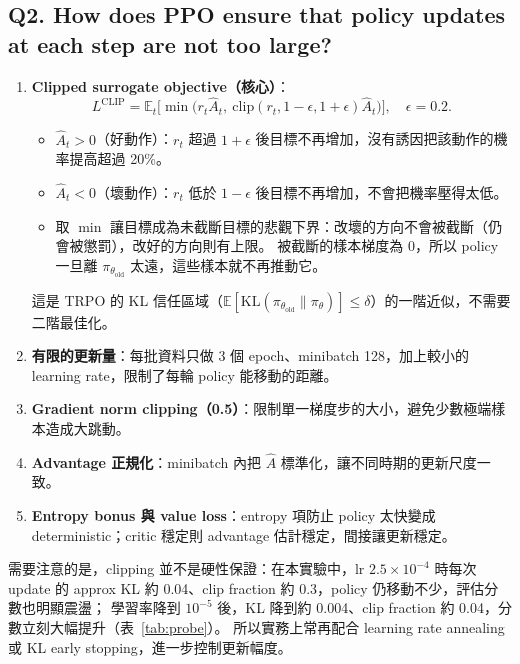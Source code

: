 \documentclass[11pt,a4paper]{article}
\begin{document}
\subsection*{Q2. How does PPO ensure that policy updates at each step are not too large?}
\begin{enumerate}[leftmargin=1.5em]
  \item \textbf{Clipped surrogate objective（核心）}：
  \[
  L^{\text{CLIP}}=\mathbb{E}_t\big[\min\big(r_t\hat A_t,\ \mathrm{clip}(r_t,1-\epsilon,1+\epsilon)\hat A_t\big)\big],\quad \epsilon=0.2 .
  \]
  \begin{itemize}[leftmargin=1.2em]
    \item $\hat A_t>0$（好動作）：$r_t$ 超過 $1+\epsilon$ 後目標不再增加，沒有誘因把該動作的機率提高超過 20\%。
    \item $\hat A_t<0$（壞動作）：$r_t$ 低於 $1-\epsilon$ 後目標不再增加，不會把機率壓得太低。
    \item 取 $\min$ 讓目標成為未截斷目標的悲觀下界：改壞的方向不會被截斷（仍會被懲罰），改好的方向則有上限。
          被截斷的樣本梯度為 0，所以 policy 一旦離 $\pi_{\theta_\text{old}}$ 太遠，這些樣本就不再推動它。
  \end{itemize}
  這是 TRPO 的 KL 信任區域（$\mathbb{E}[\mathrm{KL}(\pi_{\theta_\text{old}}\|\pi_\theta)]\le\delta$）的一階近似，不需要二階最佳化。
  \item \textbf{有限的更新量}：每批資料只做 3 個 epoch、minibatch 128，加上較小的 learning rate，限制了每輪 policy 能移動的距離。
  \item \textbf{Gradient norm clipping（0.5）}：限制單一梯度步的大小，避免少數極端樣本造成大跳動。
  \item \textbf{Advantage 正規化}：minibatch 內把 $\hat A$ 標準化，讓不同時期的更新尺度一致。
  \item \textbf{Entropy bonus 與 value loss}：entropy 項防止 policy 太快變成 deterministic；critic 穩定則 advantage 估計穩定，間接讓更新穩定。
\end{enumerate}
需要注意的是，clipping 並不是硬性保證：在本實驗中，lr $2.5\times10^{-4}$ 時每次 update 的 approx KL 約 0.04、clip fraction 約 0.3，policy 仍移動不少，評估分數也明顯震盪；
學習率降到 $10^{-5}$ 後，KL 降到約 0.004、clip fraction 約 0.04，分數立刻大幅提升（表~\ref{tab:probe}）。
所以實務上常再配合 learning rate annealing 或 KL early stopping，進一步控制更新幅度。
\end{document}
